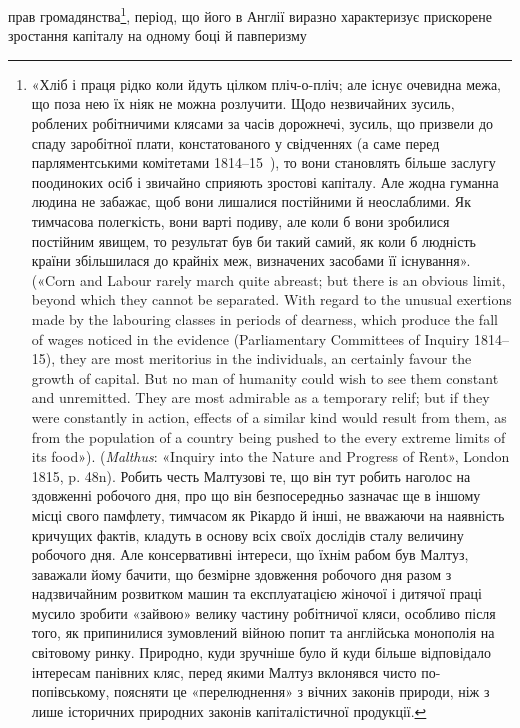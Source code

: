 прав громадянства\footnote{
«Хліб і праця рідко коли йдуть цілком пліч-о-пліч; але існує
очевидна межа, що поза нею їх ніяк не можна розлучити. Щодо незвичайних
зусиль, роблених робітничими клясами за часів дорожнечі, зусиль,
що призвели до спаду заробітної плати, констатованого у свідченнях
(а саме перед парляментськими комітетами 1814--15~), то вони
становлять більше заслугу поодиноких осіб і звичайно сприяють зростові
капіталу. Але жодна гуманна людина не забажає, щоб вони лишалися
постійними й неослаблими. Як тимчасова полегкість, вони варті
подиву, але коли б вони зробилися постійним явищем, то результат був
би такий самий, як коли б людність країни збільшилася до крайніх меж,
визначених засобами її існування». («Corn and Labour rarely march
quite abreast; but there is an obvious limit, beyond which they cannot
be separated. With regard to the unusual exertions made by the labouring
classes in periods of dearness, which produce the fall of wages noticed in
the evidence (Parliamentary Committees of Inquiry 1814--15), they are
most meritorius in the individuals, an certainly favour the growth of capital.
But no man of humanity could wish to see them constant and unremitted.
They are most admirable as a temporary relif; but if they were
constantly in action, effects of a similar kind would result from them, as
from the population of a country being pushed to the every extreme limits
of its food»). (\emph{Malthus}: «Inquiry into the Nature and Progress of Rent»,
London 1815, p. 48n). Робить честь Малтузові те, що він тут робить
наголос на здовженні робочого дня, про що він безпосередньо зазначає
ще в іншому місці свого памфлету, тимчасом як Рікардо й інші, не вважаючи
на наявність кричущих фактів, кладуть в основу всіх своїх дослідів
сталу величину робочого дня. Але консервативні інтереси, що їхнім
рабом був Малтуз, заважали йому бачити, що безмірне здовження робочого
дня разом з надзвичайним розвитком машин та експлуатацією жіночої
і дитячої праці мусило зробити «зайвою» велику частину робітничої
кляси, особливо після того, як припинилися зумовлений війною попит
та англійська монополія на світовому ринку. Природно, куди зручніше
було й куди більше відповідало інтересам панівних кляс, перед якими
Малтуз вклонявся чисто по-попівському, поясняти це «перелюднення»
з вічних законів природи, ніж з лише історичних природних законів
капіталістичної продукції.
}, період, що його в Англії виразно характеризує
прискорене зростання капіталу на одному боці й павперизму
